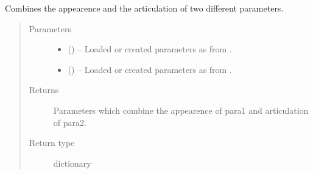 \documentclass[letterpaper,10pt,english]{sphinxmanual}
\begin{document}
\begin{fulllineitems}
\begin{fulllineitems}
\end{fulllineitems}


\begin{fulllineitems}
\label{\detokenize{index:dataset.dataset_cuboids.change_app1_art2}}
Combines the appearence and the articulation of two different parameters.
\begin{quote}\begin{description}
\item[{Parameters}] \leavevmode\begin{itemize}
\item {} 
 () -- Loaded or created parameters as from {\hyperref[\detokenize{index:dataset.dataset_cuboids.create_random_parameters}]{}}.

\item {} 
 () -- Loaded or created parameters as from {\hyperref[\detokenize{index:dataset.dataset_cuboids.create_random_parameters}]{}}.

\end{itemize}

\item[{Returns}] \leavevmode
Parameters which combine the appearence of para1 and articulation of para2.

\item[{Return type}] \leavevmode
dictionary

\end{description}\end{quote}

\end{fulllineitems}



\end{fulllineitems}
\end{document}
